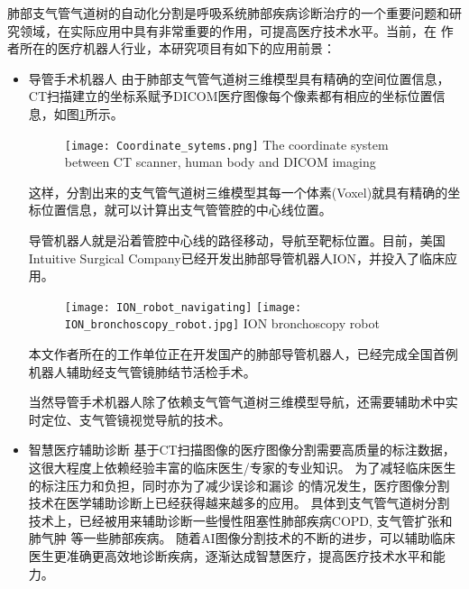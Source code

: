 肺部支气管气道树的自动化分割是呼吸系统肺部疾病诊断治疗的一个重要问题和研究领域，在实际应用中具有非常重要的作用，可提高医疗技术水平。当前，在
作者所在的医疗机器人行业，本研究项目有如下的应用前景：
\begin{itemize}
	\item {\heiti 导管手术机器人 }
	由于肺部支气管气道树三维模型具有精确的空间位置信息，CT扫描建立的坐标系赋予DICOM医疗图像每个像素都有相应的坐标位置信息，如图\ref{fig:coordinate}所示。
	\begin{figure}[!htp]
		\centering
		\texttt{[image: Coordinate\_sytems.png]}
			{The coordinate system between CT scanner, human body and DICOM imaging}
		\label{fig:coordinate}
	\end{figure}
	这样，分割出来的支气管气道树三维模型其每一个体素(Voxel)就具有精确的坐标位置信息，就可以计算出支气管管腔的中心线位置。
	
	导管机器人就是沿着管腔中心线的路径移动，导航至靶标位置。目前，美国Intuitive Surgical Company已经开发出肺部导管机器人ION，并投入了临床应用。
	\begin{figure}[!htp]
		\centering
		\texttt{[image: ION\_robot\_navigating]}
		\hspace{2mm}
		\texttt{[image: ION\_bronchoscopy\_robot.jpg]}
			{ION bronchoscopy robot}
		\label{fig:ION_robot}
	\end{figure}
	
	本文作者所在的工作单位正在开发国产的肺部导管机器人，已经完成全国首例机器人辅助经支气管镜肺结节活检手术。
	
	当然导管手术机器人除了依赖支气管气道树三维模型导航，还需要辅助术中实时定位、支气管镜视觉导航的技术。
	
	
	\item {\heiti 智慧医疗辅助诊断}
	基于CT扫描图像的医疗图像分割需要高质量的标注数据，这很大程度上依赖经验丰富的临床医生/专家的专业知识。 为了减轻临床医生的标注压力和负担，同时亦为了减少误诊和漏诊
	的情况发生，医疗图像分割技术在医学辅助诊断上已经获得越来越多的应用。 具体到支气管气道树分割技术上，已经被用来辅助诊断一些慢性阻塞性肺部疾病COPD, 支气管扩张和肺气肿
	等一些肺部疾病。 随着AI图像分割技术的不断的进步，可以辅助临床医生更准确更高效地诊断疾病，逐渐达成智慧医疗，提高医疗技术水平和能力。
\end{itemize}



